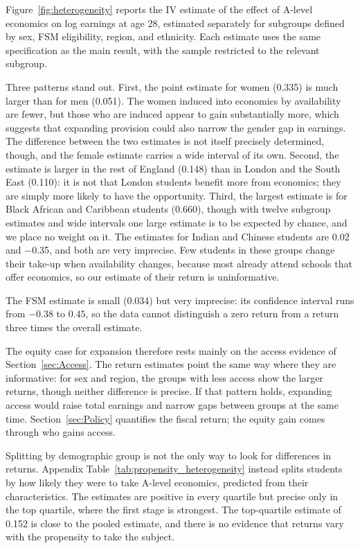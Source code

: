 Figure~\ref{fig:heterogeneity} reports the IV estimate of the effect of A-level economics on log earnings at age 28, estimated separately for subgroups defined by sex, FSM eligibility, region, and ethnicity. Each estimate uses the same specification as the main result, with the sample restricted to the relevant subgroup.



Three patterns stand out. First, the point estimate for women (0.335) is much larger than for men (0.051). The women induced into economics by availability are fewer, but those who are induced appear to gain substantially more, which suggests that expanding provision could also narrow the gender gap in earnings. The difference between the two estimates is not itself precisely determined, though, and the female estimate carries a wide interval of its own. Second, the estimate is larger in the rest of England (0.148) than in London and the South East (0.110): it is not that London students benefit more from economics; they are simply more likely to have the opportunity. Third, the largest estimate is for Black African and Caribbean students (0.660), though with twelve subgroup estimates and wide intervals one large estimate is to be expected by chance, and we place no weight on it. The estimates for Indian and Chinese students are 0.02 and $-$0.35, and both are very imprecise. Few students in these groups change their take-up when availability changes, because most already attend schools that offer economics, so our estimate of their return is uninformative.

The FSM estimate is small (0.034) but very imprecise: its confidence interval runs from $-0.38$ to $0.45$, so the data cannot distinguish a zero return from a return three times the overall estimate.

The equity case for expansion therefore rests mainly on the access evidence of Section~\ref{sec:Access}. The return estimates point the same way where they are informative: for sex and region, the groups with less access show the larger returns, though neither difference is precise. If that pattern holds, expanding access would raise total earnings and narrow gaps between groups at the same time. Section~\ref{sec:Policy} quantifies the fiscal return; the equity gain comes through who gains access.

Splitting by demographic group is not the only way to look for differences in returns. Appendix Table~\ref{tab:propensity_heterogeneity} instead splits students by how likely they were to take A-level economics, predicted from their characteristics. The estimates are positive in every quartile but precise only in the top quartile, where the first stage is strongest. The top-quartile estimate of 0.152 is close to the pooled estimate, and there is no evidence that returns vary with the propensity to take the subject.

